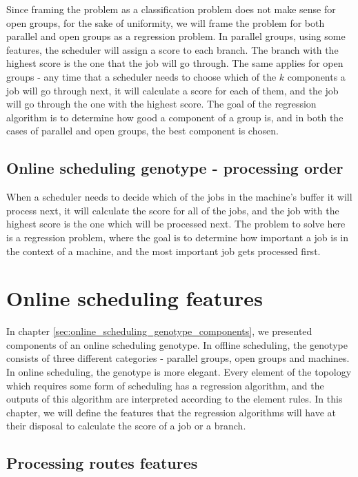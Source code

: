 Since framing the problem as a classification problem does not make sense for open groups, for the sake of uniformity, we will frame the problem for both parallel and open groups as a regression problem. In parallel groups, using some features, the scheduler will assign a score to each branch. The branch with the highest score is the one that the job will go through. The same applies for open groups - any time that a scheduler needs to choose which of the $k$ components a job will go through next, it will calculate a score for each of them, and the job will go through the one with the highest score. The goal of the regression algorithm is to determine how good a component of a group is, and in both the cases of parallel and open groups, the best component is chosen.

\subsection{Online scheduling genotype - processing order}

When a scheduler needs to decide which of the jobs in the machine's buffer it will process next, it will calculate the score for all of the jobs, and the job with the highest score is the one which will be processed next. The problem to solve here is a regression problem, where the goal is to determine how important a job is in the context of a machine, and the most important job gets processed first.

\section{Online scheduling features}
\label{sec:online_scheduling_features}

In chapter \ref{sec:online_scheduling_genotype_components}, we presented components of an online scheduling genotype. In offline scheduling, the genotype consists of three different categories - parallel groups, open groups and machines. In online scheduling, the genotype is more elegant. Every element of the topology which requires some form of scheduling has a regression algorithm, and the outputs of this algorithm are interpreted according to the element rules. In this chapter, we will define the features that the regression algorithms will have at their disposal to calculate the score of a job or a branch.

\subsection{Processing routes features}

